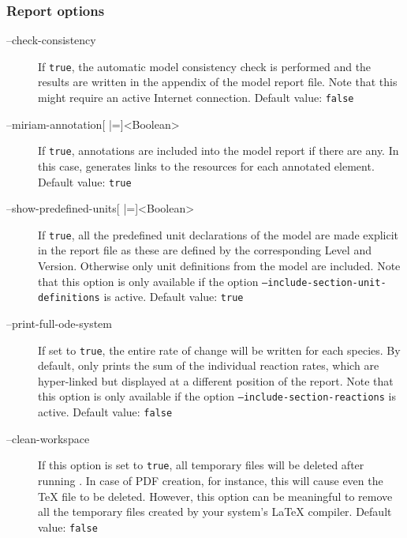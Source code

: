 \subsubsection{Report options}
\begin{description}
\item[--check-consistency]
  If \texttt{true}, the automatic model consistency check is performed and
  the results are written in the appendix of the model report file.
  Note that this might require an active Internet connection.
  Default value: \texttt{false}

\item[--miriam-annotation{[} |={]}<Boolean>]
  If \texttt{true}, \MIRIAM annotations are included into the model
  report if there are any. In this case, \SBMLLaTeX generates
  links to the resources for each annotated element.
  Default value: \texttt{true}

\item[--show-predefined-units{[} |={]}<Boolean>]
  If \texttt{true}, all the predefined unit declarations of the model
  are made explicit in the report file as these are defined by
  the corresponding \SBML Level and Version. Otherwise only unit
  definitions from the model are included. Note that this option
  is only available if the option \texttt{--include-section-unit-definitions}
  is active.
  Default value: \texttt{true}

\item[--print-full-ode-system]
  If set to \texttt{true}, the entire rate of change will be written for
  each species. By default, \SBMLLaTeX only prints the sum of
  the individual reaction rates, which are hyper-linked but displayed
  at a different position of the report. Note that this option
  is only available if the option \texttt{--include-section-reactions}
  is active.
  Default value: \texttt{false}

\item[--clean-workspace]
  If this option is set to \texttt{true}, all temporary files will be deleted
  after running \SBMLLaTeX. In case of PDF creation, for instance,
  this will cause even the \TeX{} file to be deleted. However, this
  option can be meaningful to remove all the temporary files created
  by your system's \LaTeX{} compiler.
  Default value: \texttt{false}
\end{description}

